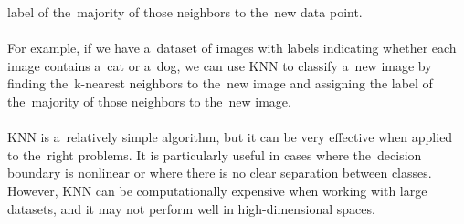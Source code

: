 label of the~majority of those neighbors to the~new data point.\\
    \\
    For example, if we have a~dataset of images with labels indicating whether each image contains a~cat or a~dog, we can use KNN to classify a~new image by finding the~k-nearest neighbors to the~new image and assigning the label of the~majority of those neighbors to the~new image.\\
    \\
    KNN is a~relatively simple algorithm, but it can be very effective when applied to the~right problems.
It is particularly useful in cases where the~decision boundary is nonlinear or where there is no clear
separation between classes. However, KNN can be computationally expensive when working with large datasets, and
it may not perform well in high-dimensional spaces.

